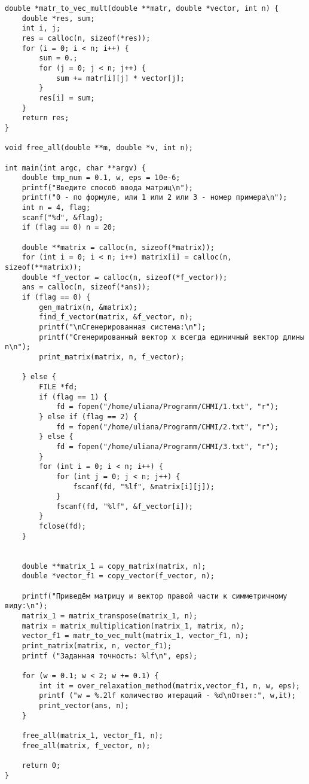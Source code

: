 \documentclass[a4paper,12pt,titlepage,finall]{article}
\begin{document}
\begin{lstlisting}
double *matr_to_vec_mult(double **matr, double *vector, int n) {
    double *res, sum;
    int i, j;
    res = calloc(n, sizeof(*res));
    for (i = 0; i < n; i++) {
        sum = 0.;
        for (j = 0; j < n; j++) {
            sum += matr[i][j] * vector[j];
        }
        res[i] = sum;
    }
    return res;
}

void free_all(double **m, double *v, int n);

int main(int argc, char **argv) {
    double tmp_num = 0.1, w, eps = 10e-6;
    printf("Введите способ ввода матриц\n");
    printf("0 - по формуле, или 1 или 2 или 3 - номер примера\n");
    int n = 4, flag;
    scanf("%d", &flag);
    if (flag == 0) n = 20;

    double **matrix = calloc(n, sizeof(*matrix));
    for (int i = 0; i < n; i++) matrix[i] = calloc(n, sizeof(**matrix));
    double *f_vector = calloc(n, sizeof(*f_vector));
    ans = calloc(n, sizeof(*ans));
    if (flag == 0) {
        gen_matrix(n, &matrix);
        find_f_vector(matrix, &f_vector, n);
        printf("\nСгенерированная система:\n");
        printf("Сгенерированный вектор x всегда единичный вектор длины n\n");
        print_matrix(matrix, n, f_vector);
        
    } else {
        FILE *fd;
        if (flag == 1) {
            fd = fopen("/home/uliana/Programm/CHMI/1.txt", "r");
        } else if (flag == 2) {
            fd = fopen("/home/uliana/Programm/CHMI/2.txt", "r");
        } else {
            fd = fopen("/home/uliana/Programm/CHMI/3.txt", "r");
        }
        for (int i = 0; i < n; i++) {
            for (int j = 0; j < n; j++) {
                fscanf(fd, "%lf", &matrix[i][j]);
            }
            fscanf(fd, "%lf", &f_vector[i]);
        }
        fclose(fd);
    }
    
    
    double **matrix_1 = copy_matrix(matrix, n);
    double *vector_f1 = copy_vector(f_vector, n);

    printf("Приведём матрицу и вектор правой части к симметричному виду:\n");
    matrix_1 = matrix_transpose(matrix_1, n);
    matrix = matrix_multiplication(matrix_1, matrix, n);
    vector_f1 = matr_to_vec_mult(matrix_1, vector_f1, n);
    print_matrix(matrix, n, vector_f1);
    printf ("Заданная точность: %lf\n", eps);
    
    for (w = 0.1; w < 2; w += 0.1) {
        int it = over_relaxation_method(matrix,vector_f1, n, w, eps);
        printf ("w = %.2lf количество итераций - %d\nОтвет:", w,it);
        print_vector(ans, n);
    }

    free_all(matrix_1, vector_f1, n);
    free_all(matrix, f_vector, n);

    return 0;
}


\end{lstlisting}
\end{document}
